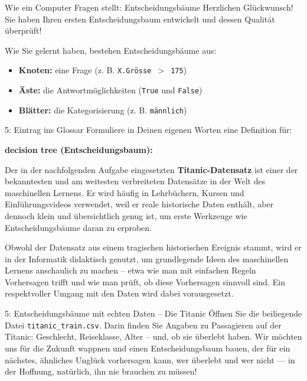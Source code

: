 \begin{lpu}{Wie ein Computer Fragen stellt: Entscheidungsbäume}
Herzlichen Glückwunsch! Sie haben Ihren ersten Entscheidungsbaum entwickelt und dessen Qualität überprüft!

\begin{theorie}
Wie Sie gelernt haben, bestehen Entscheidungsbäume aus:
\begin{itemize}
  \item \textbf{Knoten:} eine Frage (z. B. \texttt{X.Grösse $>$ 175})
  \item \textbf{Äste:} die Antwortmöglichkeiten (\texttt{True} und \texttt{False})
  \item \textbf{Blätter:} die Kategorisierung (z. B. \texttt{männlich})
\end{itemize}
\end{theorie}

\begin{aufgabe}{5: Eintrag ins Glossar}
Formuliere in Deinen eigenen Worten eine Definition für:

\textbf{decision tree (Entscheidungsbaum):} \\
\underline{\hspace{15cm}}
\end{aufgabe}

Der in der nachfolgenden Aufgabe eingesetzten \textbf{Titanic-Datensatz} ist einer der bekanntesten und am weitesten verbreiteten Datensätze in der Welt des maschinellen Lernens. Er wird häufig in Lehrbüchern, Kursen und Einführungsvideos verwendet, weil er reale historische Daten enthält, aber dennoch klein und übersichtlich genug ist, um erste Werkzeuge wie Entscheidungsbäume daran zu erproben.

Obwohl der Datensatz aus einem tragischen historischen Ereignis stammt, wird er in der Informatik didaktisch genutzt, um grundlegende Ideen des maschinellen Lernens anschaulich zu machen – etwa wie man mit einfachen Regeln Vorhersagen trifft und wie man prüft, ob diese Vorhersagen sinnvoll sind. Ein respektvoller Umgang mit den Daten wird dabei vorausgesetzt.

\begin{aufgabe}{5: Entscheidungsbäume mit echten Daten – Die Titanic}
Öffnen Sie die beiliegende Datei \texttt{titanic\_train.csv}. Darin finden Sie Angaben zu Passagieren auf der Titanic: Geschlecht, Reiseklasse, Alter – und, ob sie überlebt haben. Wir möchten uns für die Zukunft wappnen und einen Entscheidungsbaum bauen, der für ein nächstes, ähnliches Unglück vorhersagen kann, wer überlebt und wer nicht — in der Hoffnung, natürlich, ihn nie brauchen zu müssen!


\end{aufgabe}
\end{lpu}
